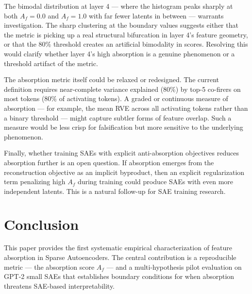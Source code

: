 \documentclass{article}
\begin{document}
The bimodal distribution at layer 4 --- where the histogram peaks sharply at both $A_f = 0.0$ and $A_f = 1.0$ with far fewer latents in between --- warrants investigation. The sharp clustering at the boundary values suggests either that the metric is picking up a real structural bifurcation in layer 4's feature geometry, or that the 80\% threshold creates an artificial bimodality in scores. Resolving this would clarify whether layer 4's high absorption is a genuine phenomenon or a threshold artifact of the metric.

The absorption metric itself could be relaxed or redesigned. The current definition requires near-complete variance explained (80\%) by top-5 co-firers on most tokens (80\% of activating tokens). A graded or continuous measure of absorption --- for example, the mean RVE across all activating tokens rather than a binary threshold --- might capture subtler forms of feature overlap. Such a measure would be less crisp for falsification but more sensitive to the underlying phenomenon.

Finally, whether training SAEs with explicit anti-absorption objectives reduces absorption further is an open question. If absorption emerges from the reconstruction objective as an implicit byproduct, then an explicit regularization term penalizing high $A_f$ during training could produce SAEs with even more independent latents. This is a natural follow-up for SAE training research.

\section{Conclusion}
\label{sec:conclusion}

This paper provides the first systematic empirical characterization of feature absorption in Sparse Autoencoders. The central contribution is a reproducible metric --- the absorption score $A_f$ --- and a multi-hypothesis pilot evaluation on GPT-2 small SAEs that establishes boundary conditions for when absorption threatens SAE-based interpretability.
\end{document}
